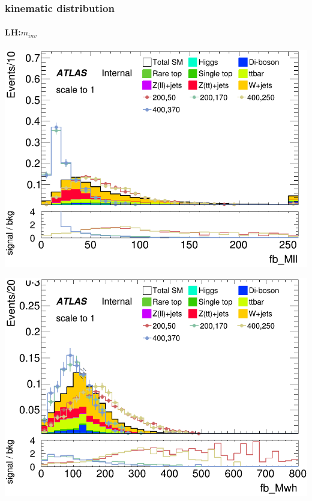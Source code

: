 \documentclass[usenames,dvipsnames]{beamer}
\begin{document}
\begin{frame}

	\frametitle{kinematic distribution}
	\framesubtitle{LH:$m_{inv}$}
    \begin{minipage}{0.32\textwidth}
        \centering
        \includegraphics[width=\textwidth]{graphics/LH_met_sig/LH_fb_Mll_norm.png}
    \end{minipage}
    \hfill
    \begin{minipage}{0.32\textwidth}
        \centering
        \includegraphics[width=\textwidth]{graphics/LH_met_sig/LH_fb_Mwh_norm.png}
    \end{minipage}
    \hfill
    \begin{minipage}{0.32\textwidth}
        \centering

\end{minipage}
\end{frame}
\end{document}
